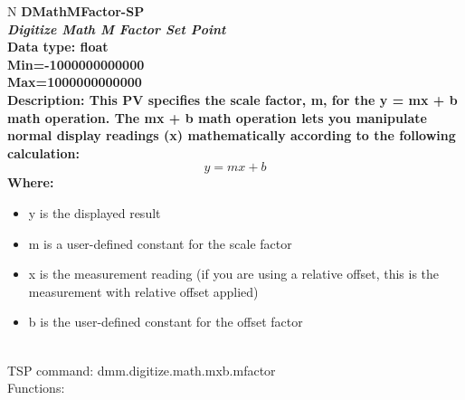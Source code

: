 \documentclass[openany]{article}
\begin{document}
		\begin{tabular}{N}
			\hline
			\bfseries DMathMFactor-SP\label{pv:dmathmfactor-sp} \\ \hline
			\emph{Digitize Math M Factor Set Point} \\
			Data type: float \\
			Min=-1000000000000 \\
			Max=1000000000000 \\
			Description: This PV specifies the scale factor, m, for the y = mx + b math operation. The mx + b math operation lets you manipulate normal display readings (x) mathematically according to the following calculation: $$ y = mx + b $$ Where: \begin{itemize} \item y is the displayed result \item m is a user-defined constant for the scale factor \item x is the measurement reading (if you are using a relative offset, this is the measurement with relative offset applied) \item b is the user-defined constant for the offset factor \end{itemize} \\
			TSP command: dmm.digitize.math.mxb.mfactor \\
			Functions: \\
			\arrayrulecolor{\FuncTableBorderColor}

		\end{tabular}
\end{document}
